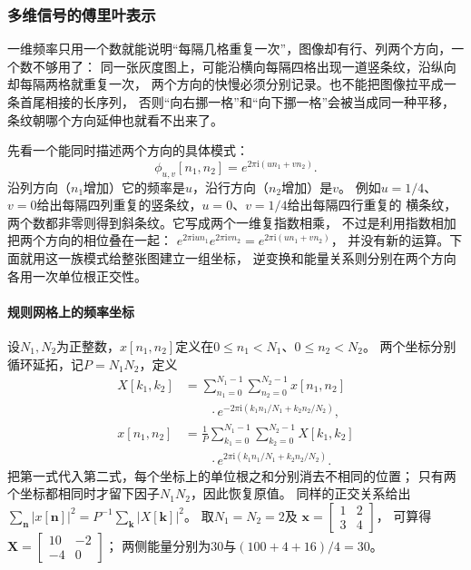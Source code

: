 \subsubsection{多维信号的傅里叶表示}
\label{sec:signal-multidimensional-fourier}

一维频率只用一个数就能说明“每隔几格重复一次”，图像却有行、列两个方向，一个数不够用了：
同一张灰度图上，可能沿横向每隔四格出现一道竖条纹，沿纵向却每隔两格就重复一次，
两个方向的快慢必须分别记录。也不能把图像拉平成一条首尾相接的长序列，
否则“向右挪一格”和“向下挪一格”会被当成同一种平移，条纹朝哪个方向延伸也就看不出来了。

先看一个能同时描述两个方向的具体模式：
\[
  \phi_{u,v}[n_1,n_2]=e^{2\pi\mathrm i(un_1+vn_2)}.
\]
沿列方向（$n_1$增加）它的频率是$u$，沿行方向（$n_2$增加）是$v$。
例如$u=1/4$、$v=0$给出每隔四列重复的竖条纹，$u=0$、$v=1/4$给出每隔四行重复的
横条纹，两个数都非零则得到斜条纹。它写成两个一维复指数相乘，
不过是利用指数相加把两个方向的相位叠在一起：
$e^{2\pi\mathrm iun_1}e^{2\pi\mathrm ivn_2}=e^{2\pi\mathrm i(un_1+vn_2)}$，
并没有新的运算。下面就用这一族模式给整张图建立一组坐标，
逆变换和能量关系则分别在两个方向各用一次单位根正交性。

\paragraph{规则网格上的频率坐标}
设$N_1,N_2$为正整数，$x[n_1,n_2]$定义在$0\leq n_1<N_1$、$0\leq n_2<N_2$。
两个坐标分别循环延拓，记$P=N_1N_2$，定义
\begin{equation}
 \begin{aligned}
 X[k_1,k_2]
 &=\sum_{n_1=0}^{N_1-1}\sum_{n_2=0}^{N_2-1}
 x[n_1,n_2]\\
 &\qquad\cdot e^{-2\pi\mathrm i(k_1n_1/N_1+k_2n_2/N_2)},\\
 x[n_1,n_2]
 &=\frac1P\sum_{k_1=0}^{N_1-1}\sum_{k_2=0}^{N_2-1}
 X[k_1,k_2]\\
 &\qquad\cdot e^{2\pi\mathrm i(k_1n_1/N_1+k_2n_2/N_2)}.
 \end{aligned}
 \label{eq:signal-multidimensional-dft}
\end{equation}
把第一式代入第二式，每个坐标上的单位根之和分别消去不相同的位置；
只有两个坐标都相同时才留下因子$N_1N_2$，因此恢复原值。
同样的正交关系给出
$\sum_{\bm n}|x[\bm n]|^2=P^{-1}\sum_{\bm k}|X[\bm k]|^2$。
取$N_1=N_2=2$及
$\bm x=\begin{bmatrix}1&2\\3&4\end{bmatrix}$，
可算得$\bm X=\begin{bmatrix}10&-2\\-4&0\end{bmatrix}$；
两侧能量分别为$30$与$(100+4+16)/4=30$。

